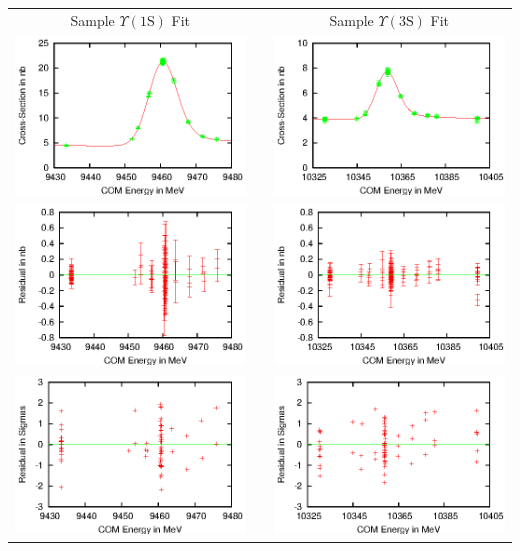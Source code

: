 \begin{slide*}
\begin{minipage}[t]{\linewidth}
\begin{center}
  \begin{tabular}{c p{1cm} c}
    Sample $\Upsilon(\mbox{1S})$ Fit & & Sample $\Upsilon(\mbox{3S})$ Fit \\
    \includegraphics[width=0.4\linewidth]{y1s_lineshape.eps} & & 
      \includegraphics[width=0.4\linewidth]{y3s_lineshape.eps} \\
    \includegraphics[width=0.4\linewidth]{y1s_resid.eps} & & 
      \includegraphics[width=0.4\linewidth]{y3s_resid.eps} \\
    \includegraphics[width=0.4\linewidth]{y1s_normresid.eps} & & 
      \includegraphics[width=0.4\linewidth]{y3s_normresid.eps} \\
  \end{tabular}
\end{center}


\end{minipage}
\end{slide*}
